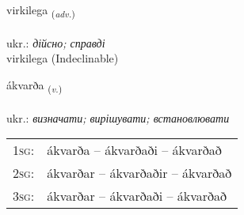 \documentclass[frontgrid, backgrid]{flacards}\usepackage[]{graphicx}\usepackage[]{xcolor}
\begin{document}

\renewcommand{\flhead}{\vskip5pt \fboxsep=0pt {\small\bfseries\footnotesize Atviksorð | прислівник}}
\renewcommand{\fcfoot}{\vskip5pt \fboxsep=0pt \hspace{2pt}{\small\bfseries\footnotesize 3K}}

\renewcommand{\blhead}{\vskip5pt {\small\bfseries\footnotesize Atviksorð | прислівник }}
\renewcommand{\bcfoot}{\vskip5pt \hspace{2pt}{\small\bfseries\footnotesize 3K}}


{virkilega \small{\textsubscript{(\textit{adv.})}} \\[1ex]
 \\
ukr.: \emph{дійсно; справді} \\  [2ex]
virkilega (Indeclinable)}

\renewcommand{\flhead}{\vskip5pt \fboxsep=0pt {\small\bfseries\footnotesize Sagnorð | дієслово}}
\renewcommand{\fcfoot}{\vskip5pt \fboxsep=0pt \hspace{2pt}{\small\bfseries\footnotesize 3K}}

\renewcommand{\blhead}{\vskip5pt {\small\bfseries\footnotesize Sagnorð | дієслово }}
\renewcommand{\bcfoot}{\vskip5pt \hspace{2pt}{\small\bfseries\footnotesize 3K}}


{ákvarða \small{\textsubscript{(\textit{v.})}} \\[1ex] %
\textphonetic{[auːkʰvarða]} \\
ukr.: \emph{визначати; вирішувати; встановлювати} \\  [2ex]
\renewcommand*{\arraystretch}{0.8}
\begin{tabular}{p{1cm}l}
\textsc{1sg}: & ákvarða -- ákvarðaði -- ákvarðað \\ 
\textsc{2sg}: & ákvarðar -- ákvarðaðir -- ákvarðað \\ 
\textsc{3sg}: & ákvarðar -- ákvarðaði -- ákvarðað \\ 
\end{tabular}
}
\end{document}
